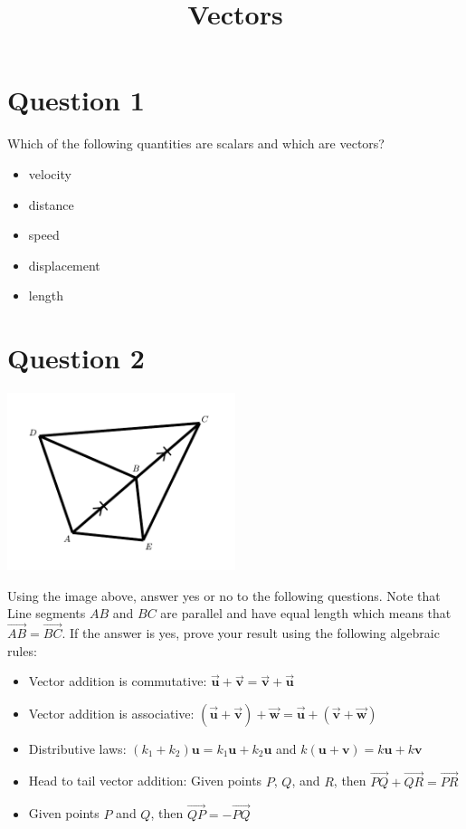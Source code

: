 \documentclass{article}
\title{Vectors}
\date{}
\newcommand{\mvec}[1]{\overrightarrow{\mathbf{#1}}}
\newcommand{\pvec}[1]{\overrightarrow{#1}}
\begin{document}
\maketitle

\section*{Question 1}

Which of the following quantities are scalars and which are vectors?

\begin{itemize}
\item velocity 
\item distance
\item speed
\item displacement
\item length
\end{itemize}

\section*{Question 2}

\includegraphics[width = 0.5\textwidth]{Vectors_Assessment_Image_1}

Using the image above, answer yes or no to the following questions. Note that Line segments \(AB\) and \(BC\) are parallel and have equal length which means that \(\pvec{AB} = \pvec{BC}\). If the answer is yes, prove your result using the following algebraic rules:
\begin{itemize}
\item Vector addition is commutative: \(\mvec{u} + \mvec{v} = \mvec{v} + \mvec{u}\)
\item Vector addition is associative: \((\mvec{u} + \mvec{v}) + \mvec{w} = \mvec{u} + (\mvec{v} + \mvec{w})\)   
\item Distributive laws: \((k_1 + k_2)\mathbf{u} = k_1\mathbf{u} + k_2\mathbf{u}\) and \(k(\mathbf{u} + \mathbf{v}) = k\mathbf{u} + k\mathbf{v}\)
\item Head to tail vector addition: Given points \(P\), \(Q\), and \(R\), then \(\pvec{PQ} + \pvec{QR} = \pvec{PR}\)
\item Given points \(P\) and \(Q\), then \(\pvec{QP} = -\pvec{PQ}\)
\end{itemize}
\end{document}
